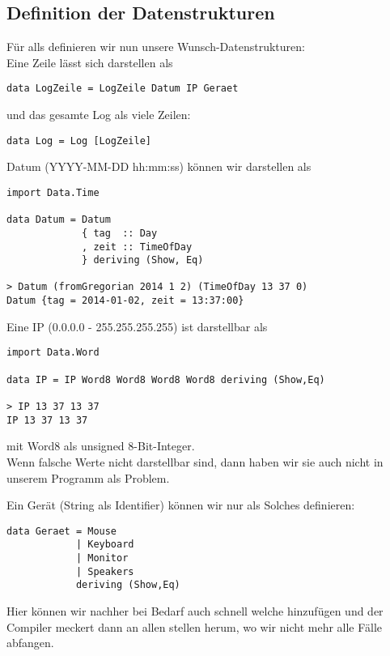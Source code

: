 \documentclass{beamer}
\begin{document}
\subsection{Definition der Datenstrukturen}
\begin{frame}[fragile]
Für alls definieren wir nun unsere Wunsch-Datenstrukturen:\\\pause
\bigskip
Eine Zeile lässt sich darstellen als
\begin{verbatim}
data LogZeile = LogZeile Datum IP Geraet
\end{verbatim}
und das gesamte Log als viele Zeilen:
\begin{verbatim}
data Log = Log [LogZeile]
\end{verbatim}
\end{frame}

\begin{frame}[fragile]
Datum (YYYY-MM-DD hh:mm:ss) können wir darstellen als
\begin{verbatim}
import Data.Time

data Datum = Datum
             { tag  :: Day
             , zeit :: TimeOfDay
             } deriving (Show, Eq)

> Datum (fromGregorian 2014 1 2) (TimeOfDay 13 37 0)
Datum {tag = 2014-01-02, zeit = 13:37:00}
\end{verbatim}

\end{frame}

\begin{frame}[fragile]
Eine IP (0.0.0.0 - 255.255.255.255) ist darstellbar als
\begin{verbatim}
import Data.Word

data IP = IP Word8 Word8 Word8 Word8 deriving (Show,Eq)

> IP 13 37 13 37
IP 13 37 13 37
\end{verbatim}
mit Word8 als unsigned 8-Bit-Integer.\\
\pause
Wenn falsche Werte nicht darstellbar sind, dann haben wir sie auch nicht in unserem Programm als Problem.
\end{frame}

\begin{frame}[fragile]
Ein Gerät (String als Identifier) können wir nur als Solches definieren:
\begin{verbatim}
data Geraet = Mouse 
            | Keyboard 
            | Monitor 
            | Speakers 
            deriving (Show,Eq)
\end{verbatim}
Hier können wir nachher bei Bedarf auch schnell welche hinzufügen und der Compiler meckert dann an allen stellen herum, wo wir nicht mehr alle Fälle abfangen.
\end{frame}
\end{document}
